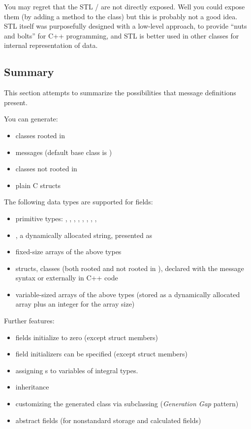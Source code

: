 You may regret that the STL / are not directly exposed.
Well you could expose them (by adding a 
method to the class) but this is probably not a good idea.
STL itself was purposefully designed with a low-level approach, to provide
``nuts and bolts'' for C++ programming, and STL is better used in other classes
for internal representation of data.



\subsection{Summary}

This section attempts to summarize the possibilities that message definitions present.

You can generate:

\begin{itemize}
  \item  classes rooted in 
  \item  messages (default base class is )
  \item  classes not rooted in 
  \item  plain C structs
\end{itemize}

The following data types are supported for fields:

\begin{itemize}
  \item  primitive types: , , ,
    , , , ,
    , 
  \item  {}, a dynamically allocated string, presented as 
  \item  fixed-size arrays of the above types
  \item  structs, classes (both rooted and not rooted in ),
    declared with the message syntax or externally in C++ code
  \item  variable-sized arrays of the above types (stored as a dynamically
    allocated array plus an integer for the array size)
\end{itemize}

Further features:

\begin{itemize}
  \item  fields initialize to zero (except struct members)
  \item  field initializers can be specified (except struct members)
  \item  assigning s to variables of integral types.
  \item  inheritance
  \item  customizing the generated class via subclassing (\textit{Generation Gap} pattern)
  \item  abstract fields (for nonstandard storage and calculated fields)
\end{itemize}

